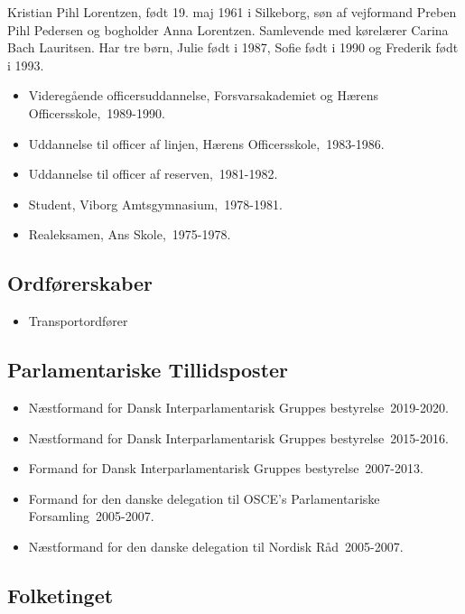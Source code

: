 \documentclass[11pt, a4paper]{awesome-cv}
\begin{document}
\makecvheader[R]
\makelettertitle
\begin{cvletter}
Kristian Pihl Lorentzen, født 19. maj 1961 i Silkeborg, søn af vejformand Preben Pihl Pedersen og bogholder Anna Lorentzen. Samlevende med kørelærer Carina Bach Lauritsen. Har tre børn, Julie født i 1987, Sofie født i 1990 og Frederik født i 1993. 

\begin{itemize}
\item Videregående officersuddannelse, Forsvarsakademiet og Hærens Officersskole, 1989-1990.
\item Uddannelse til officer af linjen, Hærens Officersskole, 1983-1986.
\item Uddannelse til officer af reserven, 1981-1982.
\item Student, Viborg Amtsgymnasium, 1978-1981.
\item Realeksamen, Ans Skole, 1975-1978.
\end{itemize}
\subsection*{Ordførerskaber}
\begin{itemize}
\item Transportordfører
\end{itemize}
\subsection*{Parlamentariske Tillidsposter}
\begin{itemize}
\item Næstformand for Dansk Interparlamentarisk Gruppes bestyrelse 2019-2020.
\item Næstformand for Dansk Interparlamentarisk Gruppes bestyrelse 2015-2016.
\item Formand for Dansk Interparlamentarisk Gruppes bestyrelse 2007-2013.
\item Formand for den danske delegation til OSCE’s Parlamentariske Forsamling 2005-2007.
\item Næstformand for den danske delegation til Nordisk Råd 2005-2007.
\end{itemize}
\subsection*{Folketinget}

\end{cvletter}
\end{document}
